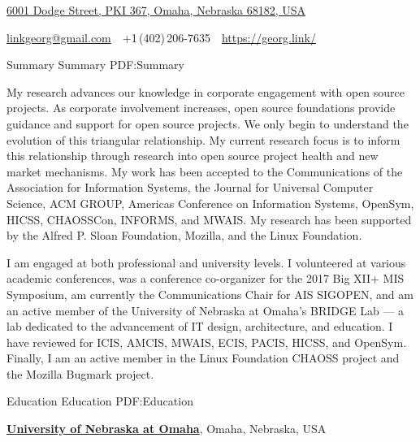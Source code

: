 \documentclass[letterpaper,MMMyyyy,nonstopmode]{simpleresumecv}
\newcommand{\CVWebpage}{https://georg.link/}
\begin{document}


\begin{SubTitle}
\href{https://www.google.com/maps/place/University+of+Nebraska+at+Omaha}
{6001 Dodge Street, PKI 367, Omaha, Nebraska 68182, USA}
\par
\href{mailto:linkgeorg@gmail.com}
{linkgeorg@gmail.com}
\,\SubBulletSymbol\,
+1\,(402)\,206-7635
\,\SubBulletSymbol\,
\href{\CVWebpage}
{\url{\CVWebpage}}
\end{SubTitle}

\begin{Body}


\Section
{Summary}
{Summary}
{PDF:Summary}

My research advances our knowledge in corporate engagement with open
source projects. As corporate involvement increases, open source foundations
provide guidance and support for open source projects. We only begin to
understand the evolution of this triangular relationship. My current research focus 
is to inform this relationship through research into open source project health 
and new market mechanisms. 
My work has been accepted to 
the Communications of the Association for Information Systems,
the Journal for Universal Computer Science,
ACM GROUP, 
Americas Conference on Information Systems,
OpenSym,
HICSS, 
CHAOSSCon,
INFORMS,
and MWAIS.
My research has been supported by the Alfred P. Sloan Foundation, Mozilla, and the Linux Foundation.


\BigGap
I am engaged at both professional and university levels. I volunteered 
at various academic conferences, was a conference co-organizer for the 
2017 Big XII+ MIS Symposium, am currently the Communications Chair for AIS SIGOPEN, 
and am an active member of the University of Nebraska at Omaha's BRIDGE Lab ---
a lab dedicated to the advancement of IT design, architecture, and education. 
I have reviewed for ICIS, AMCIS, MWAIS, ECIS, PACIS, HICSS, and OpenSym.
Finally, I am an active member in the Linux Foundation CHAOSS project and 
the Mozilla Bugmark project.



\Section
{Education}
{Education}
{PDF:Education}

\Entry
\href{http://unomaha.edu/}
{\textbf{University of Nebraska at Omaha}},
Omaha, Nebraska, USA


\end{Body}
\end{document}
